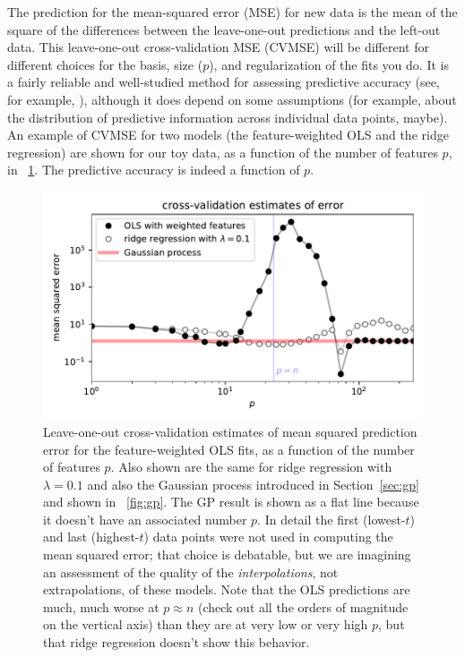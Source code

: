 \documentclass[12pt,letterpaper]{article}
\newlength{\figurewidth}
\newcommand{\sectionname}{Section}
\begin{document}
The prediction for the mean-squared error (MSE) for new data is the mean of the square of the differences between the leave-one-out predictions and the left-out data.
This leave-one-out cross-validation MSE (CVMSE) will be different for different choices for the basis, size ($p$), and regularization of the fits you do.
It is a fairly reliable and well-studied method for assessing predictive accuracy (see, for example, \citealt{cv}), although it does depend on some assumptions (for example, about the distribution of predictive information across individual data points, maybe).
An example of CVMSE for two models (the feature-weighted OLS and the ridge regression) are shown for our toy data, as a function of the number of features $p$, in \figurename~\ref{fig:cv}.
The predictive accuracy is indeed a function of $p$.
\begin{figure}[t]
    \begin{mdframed}
    \includegraphics[width=\figurewidth]{paper/cross-validation.pdf}
    \caption{Leave-one-out cross-validation estimates of mean squared prediction error for the feature-weighted OLS fits, as a function of the number of features $p$. Also shown are the same for ridge regression with $\lambda=0.1$ and also the Gaussian process introduced in \sectionname~\ref{sec:gp} and shown in \figurename~\ref{fig:gp}. The GP result is shown as a flat line because it doesn't have an associated number $p$. In detail the first (lowest-$t$) and last (highest-$t$) data points were not used in computing the mean squared error; that choice is debatable, but we are imagining an assessment of the quality of the \emph{interpolations}, not extrapolations, of these models. Note that the OLS predictions are much, much worse at $p\approx n$ (check out all the orders of magnitude on the vertical axis) than they are at very low or very high $p$, but that ridge regression doesn't show this behavior.}
    \label{fig:cv}
    \end{mdframed}
\end{figure}
\end{document}

